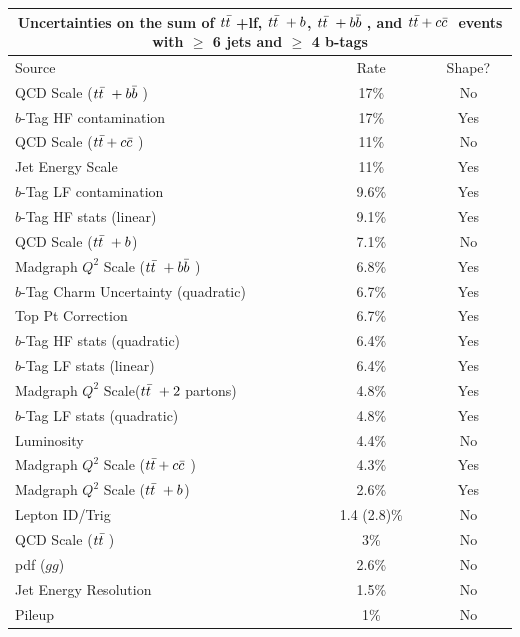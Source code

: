 \begin{table}[hbtp] \small
\centering
\begin{tabular}{lcc}
\hline
\hline
\multicolumn{3}{c}{Uncertainties on the sum of $t{\bar{t}}~$+lf, $t{\bar{t}}~+b$, $t{\bar{t}}~+b{\bar{b}}~$, and $t{\bar{t}}+c{\bar{c}}~$ events with $\geq$ 6 jets and $\geq$ 4 b-tags}\\
\hline
Source                           & Rate      & Shape?  \\
\hline
QCD Scale ($t{\bar{t}}~+b{\bar{b}}~$)           & 17\%    & No      \\
$b$-Tag HF contamination              & 17\%  & Yes     \\
QCD Scale ($t{\bar{t}}+c{\bar{c}}~$)           & 11\%    & No      \\
Jet Energy Scale                 & 11\%    & Yes     \\
$b$-Tag LF contamination              & 9.6\%  & Yes     \\
$b$-Tag HF stats (linear)        & 9.1\%  & Yes     \\
QCD Scale ($t{\bar{t}}~+b$)           & 7.1\%    & No      \\
Madgraph $Q^2$ Scale ($t{\bar{t}}~+b{\bar{b}}~$)       & 6.8\%   & Yes      \\
$b$-Tag Charm Uncertainty (quadratic)        & 6.7\%  & Yes     \\
Top Pt Correction                & 6.7\%     & Yes     \\
$b$-Tag HF stats (quadratic)     & 6.4\%  & Yes     \\
$b$-Tag LF stats (linear)        & 6.4\%  & Yes     \\
Madgraph $Q^2$ Scale($t{\bar{t}}~+2$ partons) & 4.8\%    & Yes    \\
$b$-Tag LF stats (quadratic)     & 4.8\%  & Yes     \\
Luminosity                       & 4.4\%     & No      \\
Madgraph $Q^2$ Scale ($t{\bar{t}}+c{\bar{c}}~$)       & 4.3\%   & Yes      \\
 Madgraph $Q^2$ Scale ($t{\bar{t}}~+b$)       & 2.6\%   & Yes      \\
Lepton ID/Trig                   & 1.4 (2.8)\%     & No      \\
QCD Scale ($t{\bar{t}}~$)           & 3\%    & No      \\
pdf ($gg$)                       & 2.6\%       & No      \\
Jet Energy Resolution            & 1.5\%     & No      \\
Pileup                           & 1\%       & No      \\

\end{tabular}
\end{table}
